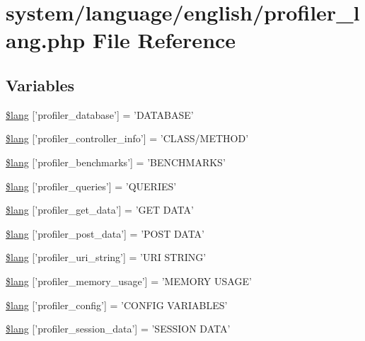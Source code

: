 \hypertarget{profiler__lang_8php}{\section{system/language/english/profiler\-\_\-lang.php File Reference}
\label{profiler__lang_8php}
}
\subsection*{Variables}
\begin{DoxyCompactItemize}
\item 
\hyperlink{profiler__lang_8php_a93beea1bc75788ad2b7d3d3895984282}{\$lang} \mbox{[}'profiler\-\_\-database'\mbox{]} = 'D\-A\-T\-A\-B\-A\-S\-E'
\item 
\hyperlink{profiler__lang_8php_a13e794a194b3fae4ac89472fa90a39a4}{\$lang} \mbox{[}'profiler\-\_\-controller\-\_\-info'\mbox{]} = 'C\-L\-A\-S\-S/M\-E\-T\-H\-O\-D'
\item 
\hyperlink{profiler__lang_8php_a542e9f6b34cf149d1574a8f6b2c9568d}{\$lang} \mbox{[}'profiler\-\_\-benchmarks'\mbox{]} = 'B\-E\-N\-C\-H\-M\-A\-R\-K\-S'
\item 
\hyperlink{profiler__lang_8php_ac8efd051248fb102a6cc0c9b418ffd6d}{\$lang} \mbox{[}'profiler\-\_\-queries'\mbox{]} = 'Q\-U\-E\-R\-I\-E\-S'
\item 
\hyperlink{profiler__lang_8php_aed0d74a29b2ef17977baa94091d06058}{\$lang} \mbox{[}'profiler\-\_\-get\-\_\-data'\mbox{]} = 'G\-E\-T D\-A\-T\-A'
\item 
\hyperlink{profiler__lang_8php_a6b2928f829db3649049332dc4468018d}{\$lang} \mbox{[}'profiler\-\_\-post\-\_\-data'\mbox{]} = 'P\-O\-S\-T D\-A\-T\-A'
\item 
\hyperlink{profiler__lang_8php_a1f1644f4e586555cb83f718552502136}{\$lang} \mbox{[}'profiler\-\_\-uri\-\_\-string'\mbox{]} = 'U\-R\-I S\-T\-R\-I\-N\-G'
\item 
\hyperlink{profiler__lang_8php_aaffc8cc3dd25f21388a6edb5fbfc8859}{\$lang} \mbox{[}'profiler\-\_\-memory\-\_\-usage'\mbox{]} = 'M\-E\-M\-O\-R\-Y U\-S\-A\-G\-E'
\item 
\hyperlink{profiler__lang_8php_a68a43f2ac48abfc21cd12ee19e75e421}{\$lang} \mbox{[}'profiler\-\_\-config'\mbox{]} = 'C\-O\-N\-F\-I\-G V\-A\-R\-I\-A\-B\-L\-E\-S'
\item 
\hyperlink{profiler__lang_8php_a6caa2b856b3211345f4a916febd79a84}{\$lang} \mbox{[}'profiler\-\_\-session\-\_\-data'\mbox{]} = 'S\-E\-S\-S\-I\-O\-N D\-A\-T\-A'

\end{DoxyCompactItemize}
